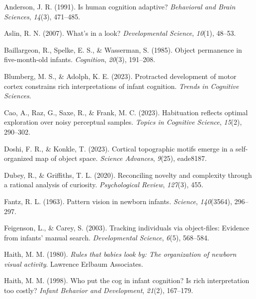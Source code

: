 \documentclass[10pt, letterpaper]{article}
\newenvironment{CSLReferences}%
  {}%
  {\par}
\begin{document}
\hypertarget{refs}{}
\begin{CSLReferences}{1}{0}
\leavevmode{}%
Anderson, J. R. (1991). Is human cognition adaptive? \emph{Behavioral
and Brain Sciences}, \emph{14}(3), 471--485.

\leavevmode{}%
Aslin, R. N. (2007). What's in a look? \emph{Developmental Science},
\emph{10}(1), 48--53.

\leavevmode{}%
Baillargeon, R., Spelke, E. S., \& Wasserman, S. (1985). Object
permanence in five-month-old infants. \emph{Cognition}, \emph{20}(3),
191--208.

\leavevmode{}%
Blumberg, M. S., \& Adolph, K. E. (2023). Protracted development of
motor cortex constrains rich interpretations of infant cognition.
\emph{Trends in Cognitive Sciences}.

\leavevmode{}%
Cao, A., Raz, G., Saxe, R., \& Frank, M. C. (2023). Habituation reflects
optimal exploration over noisy perceptual samples. \emph{Topics in
Cognitive Science}, \emph{15}(2), 290--302.

\leavevmode{}%
Doshi, F. R., \& Konkle, T. (2023). Cortical topographic motifs emerge
in a self-organized map of object space. \emph{Science Advances},
\emph{9}(25), eade8187.

\leavevmode{}%
Dubey, R., \& Griffiths, T. L. (2020). Reconciling novelty and
complexity through a rational analysis of curiosity. \emph{Psychological
Review}, \emph{127}(3), 455.

\leavevmode{}%
Fantz, R. L. (1963). Pattern vision in newborn infants. \emph{Science},
\emph{140}(3564), 296--297.

\leavevmode{}%
Feigenson, L., \& Carey, S. (2003). Tracking individuals via
object-files: Evidence from infants' manual search. \emph{Developmental
Science}, \emph{6}(5), 568--584.

\leavevmode{}%
Haith, M. M. (1980). \emph{Rules that babies look by: The organization
of newborn visual activity}. Lawrence Erlbaum Associates.

\leavevmode{}%
Haith, M. M. (1998). Who put the cog in infant cognition? Is rich
interpretation too costly? \emph{Infant Behavior and Development},
\emph{21}(2), 167--179.


\end{CSLReferences}
\end{document}
